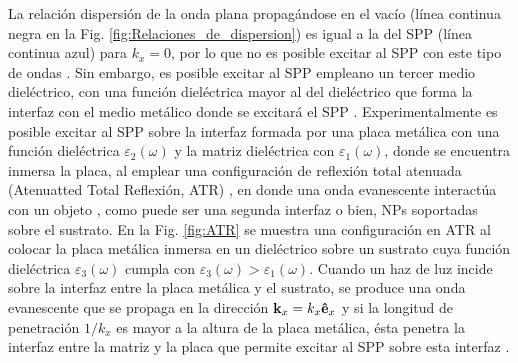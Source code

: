 La relación dispersión de la onda plana propagándose en el vacío (línea continua negra en la Fig. \ref{fig:Relaciones_de_dispersion})  es igual a la del SPP (línea continua azul) para  $k_x=0$, por lo que no es posible excitar al SPP con este tipo de ondas \cite{trugler2011properties}. Sin embargo, es posible excitar al SPP empleano un tercer medio dieléctrico, con una función dieléctrica mayor al del dieléctrico que forma la interfaz con el medio metálico donde se excitará el SPP \cite{trugler2011properties}. Experimentalmente es posible excitar al SPP sobre la interfaz formada por una placa metálica con una función dieléctrica $\varepsilon_2(\omega)$ y la matriz dieléctrica con $\varepsilon_1(\omega)$, donde se encuentra inmersa la placa, al emplear una configuración de reflexión total atenuada (Atenuatted Total Reflexión, ATR) \cite{kabashin2009plasmonic}, en donde una onda evanescente interactúa con un objeto \cite{hecht1998optics}, como puede ser una segunda interfaz o bien, NPs soportadas sobre el sustrato. En la Fig. \ref{fig:ATR} se muestra una configuración en ATR al colocar la placa metálica inmersa en un dieléctrico sobre un sustrato cuya función dieléctrica $\varepsilon_3(\omega)$ cumpla con $\varepsilon_3(\omega)>\varepsilon_1(\omega)$. Cuando un haz de luz incide sobre la interfaz entre la placa metálica y el sustrato, se produce una onda evanescente que se propaga en la dirección $\vb{k}_x=k_x\vu{e}_x$ y si la longitud de penetración $1/k_x$ es mayor a la altura de la placa metálica, ésta penetra la interfaz entre la matriz y la placa que permite excitar al SPP sobre esta interfaz \cite{trugler2011properties}. 	
	
